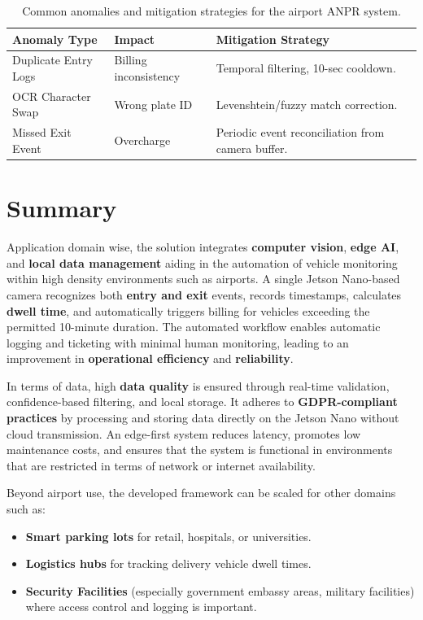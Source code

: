 \begin{table}[h!]
	\centering
	\small
	\begin{tabular}{p{4cm} p{2.5cm} p{6cm}}
		\toprule
		\textbf{Anomaly Type} & \textbf{Impact} & \textbf{Mitigation Strategy} \\
		\midrule
		Duplicate Entry Logs & Billing inconsistency & Temporal filtering, 10-sec cooldown. \\
		\ac{OCR} Character Swap & Wrong plate ID & Levenshtein/fuzzy match correction. \\
		Missed Exit Event & Overcharge & Periodic event reconciliation from camera buffer. \\
		\bottomrule
	\end{tabular}
	\caption{Common anomalies and mitigation strategies for the airport \ac{ANPR} system.}
	\label{tab:anomalies-airport}
\end{table}

\section*{Summary}
Application domain wise, the solution integrates \textbf{computer vision}, \textbf{edge \ac{AI}}, and \textbf{local data management} aiding in the automation of vehicle monitoring within high density environments such as airports. 
A single Jetson Nano-based camera recognizes both \textbf{entry and exit} events, records timestamps, calculates \textbf{dwell time}, and automatically triggers billing for vehicles exceeding the permitted 10-minute duration.  
The automated workflow enables automatic logging and ticketing with minimal human monitoring, leading to an improvement in \textbf{operational efficiency} and \textbf{reliability}.

In terms of data, high \textbf{data quality} is ensured through real-time validation, confidence-based filtering, and local storage.  
It adheres to \textbf{\ac{GDPR}-compliant practices} by processing and storing data directly on the Jetson Nano without cloud transmission.  
An edge-first system reduces latency, promotes low maintenance costs, and ensures that the system is functional in environments that are restricted in terms of network or internet availability.

Beyond airport use, the developed framework can be scaled for other domains such as:
\begin{itemize}
	\item \textbf{Smart parking lots} for retail, hospitals, or universities.  
	\item \textbf{Logistics hubs} for tracking delivery vehicle dwell times.  
	\item \textbf{Security Facilities} (especially government embassy areas, military facilities) where access control and logging is important.  
\end{itemize}

